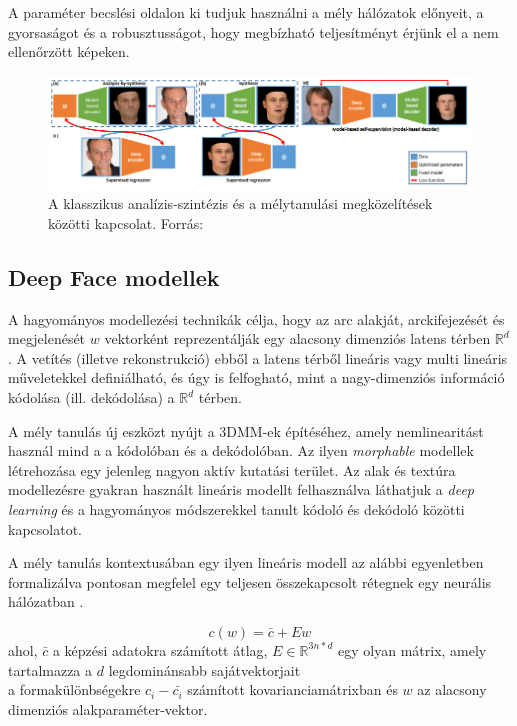 \documentclass[12pt,a4]{article}
\begin{document}
	
	A paraméter becslési oldalon ki tudjuk használni a mély hálózatok előnyeit, a gyorsaságot és a robusztusságot, hogy megbízható teljesítményt érjünk el a nem ellenőrzött képeken.
	
	\begin{figure}[h]	
		\centering
		\includegraphics[width=1\linewidth]{deep}
		\caption{A klasszikus analízis-szintézis és a mélytanulási megközelítések közötti kapcsolat. 
			Forrás:\cite{3dmm}}
	\end{figure}
	
	\newpage
	\subsection{Deep Face modellek}
	
	A hagyományos modellezési technikák célja, hogy
	az arc alakját, arckifejezését és megjelenését $w$ vektorként reprezentálják egy
	alacsony dimenziós latens térben $\mathbb{R}^d$ \cite{3dmm}. A vetítés (illetve rekonstrukció) ebből a latens térből lineáris vagy multi lineáris műveletekkel definiálható, és úgy is felfogható, mint a nagy-dimenziós információ kódolása (ill.
	dekódolása) a $\mathbb{R}^d$ térben.
	
	
	A mély tanulás új eszközt nyújt a 3DMM-ek építéséhez, amely nemlinearitást használ mind a
	a kódolóban és a dekódolóban. Az ilyen \textit{morphable} modellek létrehozása egy jelenleg nagyon aktív kutatási terület.
	Az alak és textúra modellezésre gyakran használt lineáris modellt felhasználva láthatjuk a \textit{deep learning} és a hagyományos módszerekkel tanult kódoló és dekódoló közötti kapcsolatot.
	
	
	A mély tanulás kontextusában egy ilyen lineáris modell
	az alábbi egyenletben formalizálva pontosan megfelel egy teljesen összekapcsolt rétegnek egy
	neurális hálózatban \cite{3dmm}.
	
	\begin{mdframed}
	\begin{equation}
		c(w) = \bar{c} + Ew 
	\end{equation}
		  ahol, $\bar{c}$ a képzési adatokra számított átlag, $E \in \mathbb{R}^{3n*d}$ egy olyan mátrix, amely tartalmazza a $d$ legdominánsabb sajátvektorjait \\
		  a formakülönbségekre $c_i - \bar{c_i}$ számított kovarianciamátrixban és
		$w$ az alacsony dimenziós alakparaméter-vektor.
	\end{mdframed}
	
\end{document}
